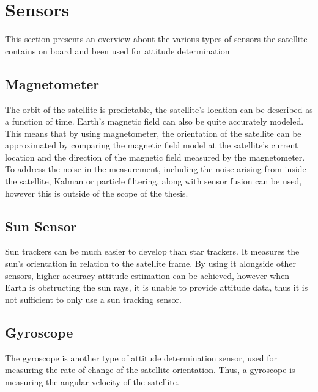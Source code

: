\section{Sensors}
This section presents an overview about the various types of sensors the satellite contains on board and been used for attitude determination
\subsection{Magnetometer}

The orbit of the satellite is predictable, the satellite's location can be described as a function of time. Earth's magnetic field can also be quite accurately modeled. This means that by using magnetometer, the orientation of the satellite can be approximated by comparing the magnetic field model at the satellite's current location and the direction of the magnetic field measured by the magnetometer. To address the noise in the measurement, including the noise arising from inside the satellite, Kalman or particle filtering, along with sensor fusion can be used, however this is outside of the scope of the thesis.

\subsection{Sun Sensor}

Sun trackers can be much easier to develop than star trackers. It measures the sun's orientation in relation to the satellite frame. By using it alongside other sensors, higher accuracy attitude estimation can be achieved, however when Earth is obstructing the sun rays, it is unable to provide attitude data, thus it is not sufficient to only use a sun tracking sensor.


\subsection{Gyroscope}


The gyroscope is another type of attitude determination sensor, used for measuring the rate of change of the satellite orientation. Thus, a gyroscope is measuring the angular velocity of the satellite.

